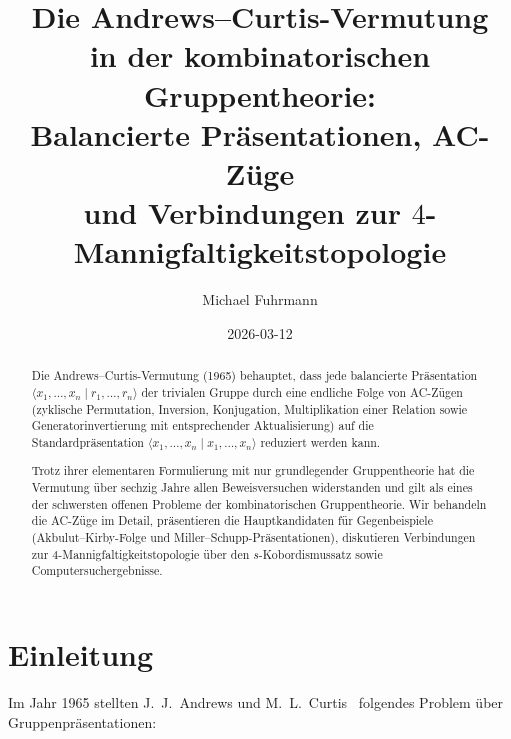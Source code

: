 \documentclass[12pt,a4paper]{amsart}
\theoremstyle{definition}
\theoremstyle{remark}
\begin{document}
\title{Die Andrews--Curtis-Vermutung\\
in der kombinatorischen Gruppentheorie:\\
Balancierte Präsentationen, AC-Züge\\
und Verbindungen zur $4$-Mannigfaltigkeitstopologie}

\author{Michael Fuhrmann}
\address{Specialist Mathematics Project, Build 166}
\date{2026-03-12}

\begin{abstract}
Die Andrews--Curtis-Vermutung (1965) behauptet, dass jede balancierte Präsentation
$\langle x_1,\ldots,x_n \mid r_1,\ldots,r_n \rangle$ der trivialen Gruppe durch
eine endliche Folge von AC-Zügen (zyklische Permutation, Inversion, Konjugation,
Multiplikation einer Relation sowie Generatorinvertierung mit entsprechender
Aktualisierung) auf die Standardpräsentation
$\langle x_1,\ldots,x_n \mid x_1,\ldots,x_n \rangle$ reduziert werden kann.

Trotz ihrer elementaren Formulierung mit nur grundlegender Gruppentheorie hat
die Vermutung über sechzig Jahre allen Beweisversuchen widerstanden und gilt als
eines der schwersten offenen Probleme der kombinatorischen Gruppentheorie.
Wir behandeln die AC-Züge im Detail, präsentieren die Hauptkandidaten für
Gegenbeispiele (Akbulut--Kirby-Folge und Miller--Schupp-Präsentationen), diskutieren
Verbindungen zur $4$-Mannigfaltigkeitstopologie über den $s$-Kobordismussatz sowie
Computersuchergebnisse.
\end{abstract}

\maketitle

\tableofcontents

\section{Einleitung}

Im Jahr 1965 stellten J.~J.\ Andrews und M.~L.\ Curtis~\cite{AC65} folgendes
Problem über Gruppenpräsentationen:
\end{document}
